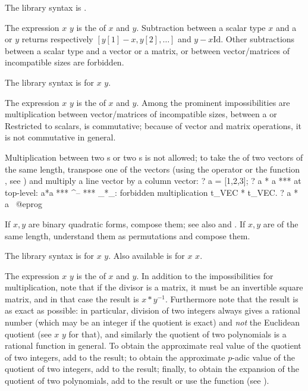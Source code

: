 The library syntax is .

\subseckbd{-} The expression $x$ \kbd{-} $y$ is the  of $x$
and $y$. Subtraction between a scalar type $x$ and a  or 
$y$ returns respectively $[y[1] - x, y[2],\dots]$ and $y - x \text{Id}$.
Other subtractions between a scalar type and a vector or a matrix, or
between vector/matrices of incompatible sizes are forbidden.

The library syntax is  for $x$ \kbd{-} $y$.

\subseckbd{*} The expression $x$ \kbd{*} $y$ is the  of $x$
and $y$. Among the prominent impossibilities are multiplication between
vector/matrices of incompatible sizes, between a  or 
Restricted to scalars, \kbd{*} is commutative; because of vector and matrix
operations, it is not commutative in general.

Multiplication between two s or two s is not
allowed; to take the  of two vectors of the same length,
transpose one of the vectors (using the operator \kbd{\til} or the function
, see ) and multiply a line vector
by a column vector:
\bprog
? a = [1,2,3];
? a * a
  ***   at top-level: a*a
  ***                  ^--
  *** _*_: forbidden multiplication t_VEC * t_VEC.
? a * a~
@eprog

If $x,y$ are binary quadratic forms, compose them; see also
 and . If $x,y$ are  of the same
length, understand them as permutations and compose them.

The library syntax is  for $x$ \kbd{*} $y$.
Also available is  for $x$ \kbd{*} $x$.

\subseckbd{/} The expression $x$ \kbd{/} $y$ is the  of $x$
and $y$. In addition to the impossibilities for multiplication, note that if
the divisor is a matrix, it must be an invertible square matrix, and in that
case the result is $x*y^{-1}$. Furthermore note that the result is as exact
as possible: in particular, division of two integers always gives a rational
number (which may be an integer if the quotient is exact) and \emph{not} the
Euclidean quotient (see $x$ \kbd{\bs} $y$ for that), and similarly the
quotient of two polynomials is a rational function in general. To obtain the
approximate real value of the quotient of two integers, add  to the
result; to obtain the approximate $p$-adic value of the quotient of two
integers, add  to the result; finally, to obtain the
 expansion of the quotient of two polynomials, add
 to the result or use the  function
(see ). \label{se:gdiv}

